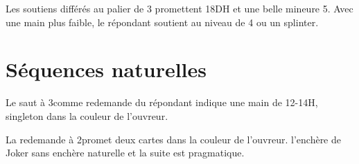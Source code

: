 \documentclass[a4paper,12pt, french, twocolumn]{article}
\begin{document}
Les soutiens différés au palier de 3 promettent 18DH et une belle mineure 5\ieme.
Avec une main plus faible, le répondant soutient au niveau de 4 ou un splinter.

\section*{Séquences naturelles}

Le saut à 3\NT comme redemande du répondant indique une main de 12-14H, singleton dans la couleur de l'ouvreur.

La redemande à 2\NT promet deux cartes dans la couleur de l'ouvreur. l'enchère de Joker sans enchère naturelle et la suite est pragmatique.
\end{document}
